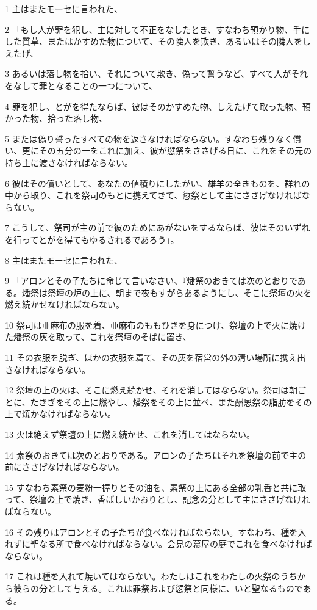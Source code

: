 \par 1 主はまたモーセに言われた、
\par 2 「もし人が罪を犯し、主に対して不正をなしたとき、すなわち預かり物、手にした質草、またはかすめた物について、その隣人を欺き、あるいはその隣人をしえたげ、
\par 3 あるいは落し物を拾い、それについて欺き、偽って誓うなど、すべて人がそれをなして罪となることの一つについて、
\par 4 罪を犯し、とがを得たならば、彼はそのかすめた物、しえたげて取った物、預かった物、拾った落し物、
\par 5 または偽り誓ったすべての物を返さなければならない。すなわち残りなく償い、更にその五分の一をこれに加え、彼が愆祭をささげる日に、これをその元の持ち主に渡さなければならない。
\par 6 彼はその償いとして、あなたの値積りにしたがい、雄羊の全きものを、群れの中から取り、これを祭司のもとに携えてきて、愆祭として主にささげなければならない。
\par 7 こうして、祭司が主の前で彼のためにあがないをするならば、彼はそのいずれを行ってとがを得てもゆるされるであろう」。
\par 8 主はまたモーセに言われた、
\par 9 「アロンとその子たちに命じて言いなさい、『燔祭のおきては次のとおりである。燔祭は祭壇の炉の上に、朝まで夜もすがらあるようにし、そこに祭壇の火を燃え続かせなければならない。
\par 10 祭司は亜麻布の服を着、亜麻布のももひきを身につけ、祭壇の上で火に焼けた燔祭の灰を取って、これを祭壇のそばに置き、
\par 11 その衣服を脱ぎ、ほかの衣服を着て、その灰を宿営の外の清い場所に携え出さなければならない。
\par 12 祭壇の上の火は、そこに燃え続かせ、それを消してはならない。祭司は朝ごとに、たきぎをその上に燃やし、燔祭をその上に並べ、また酬恩祭の脂肪をその上で焼かなければならない。
\par 13 火は絶えず祭壇の上に燃え続かせ、これを消してはならない。
\par 14 素祭のおきては次のとおりである。アロンの子たちはそれを祭壇の前で主の前にささげなければならない。
\par 15 すなわち素祭の麦粉一握りとその油を、素祭の上にある全部の乳香と共に取って、祭壇の上で焼き、香ばしいかおりとし、記念の分として主にささげなければならない。
\par 16 その残りはアロンとその子たちが食べなければならない。すなわち、種を入れずに聖なる所で食べなければならない。会見の幕屋の庭でこれを食べなければならない。
\par 17 これは種を入れて焼いてはならない。わたしはこれをわたしの火祭のうちから彼らの分として与える。これは罪祭および愆祭と同様に、いと聖なるものである。
